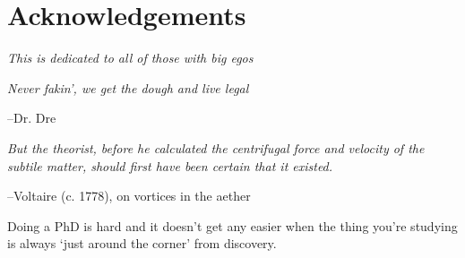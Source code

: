 \chapter*{Acknowledgements}

\begin{center}
\textit{This is dedicated to all of those with big egos}

\textit{Never fakin', we get the dough and live legal}
\end{center}
\begin{flushright}
  --Dr. Dre
\end{flushright}

\begin{center}
\textit{But the theorist, before he calculated the centrifugal force and velocity of the subtile matter, should first have been certain that it existed.}
\end{center}
\begin{flushright}
  --Voltaire (c. 1778), on vortices in the aether
\end{flushright}

Doing a PhD is hard and it doesn't get any easier when the thing you're studying is always `just around the corner' from discovery. 


